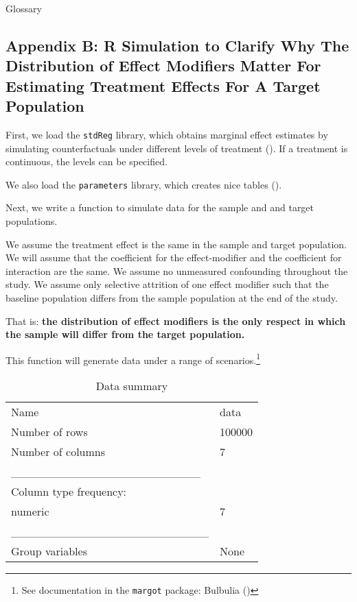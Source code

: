 \documentclass[
  single column]{article}
\begin{document}
\begin{table}

\caption{\label{tbl-experiments}Glossary}

\centering{

\glossaryTerms

}

\end{table}%

\newpage{}

\subsection{Appendix B: R Simulation to Clarify Why The Distribution of
Effect Modifiers Matter For Estimating Treatment Effects For A Target
Population}\label{appendix-b-r-simulation-to-clarify-why-the-distribution-of-effect-modifiers-matter-for-estimating-treatment-effects-for-a-target-population}

First, we load the \texttt{stdReg} library, which obtains marginal
effect estimates by simulating counterfactuals under different levels of
treatment (). If a
treatment is continuous, the levels can be specified.

We also load the \texttt{parameters} library, which creates nice tables
().

Next, we write a function to simulate data for the sample and and target
populations.

We assume the treatment effect is the same in the sample and target
population. We will assume that the coefficient for the effect-modifier
and the coefficient for interaction are the same. We assume no
unmeasured confounding throughout the study. We assume only selective
attrition of one effect modifier such that the baseline population
differs from the sample population at the end of the study.

That is: \textbf{the distribution of effect modifiers is the only
respect in which the sample will differ from the target population.}

This function will generate data under a range of scenarios.\footnote{See
  documentation in the \texttt{margot} package: Bulbulia
  ()}

\begin{longtable}[]{@{}ll@{}}
\caption{Data summary}\tabularnewline
\toprule\noalign{}
\endfirsthead
\endhead
\bottomrule\noalign{}
\endlastfoot
Name & data \\
Number of rows & 100000 \\
Number of columns & 7 \\
\_\_\_\_\_\_\_\_\_\_\_\_\_\_\_\_\_\_\_\_\_\_\_ & \\
Column type frequency: & \\
numeric & 7 \\
\_\_\_\_\_\_\_\_\_\_\_\_\_\_\_\_\_\_\_\_\_\_\_\_ & \\
Group variables & None \\
\end{longtable}
\end{document}
